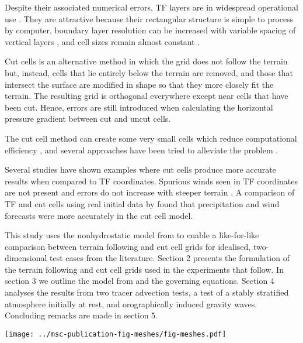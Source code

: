 \documentclass[twocol]{ametsoc}
\begin{document}
Despite their associated numerical errors, TF layers are in widespread operational use \citep{steppeler2003}.  They are attractive because their rectangular structure is simple to process by computer, boundary layer resolution can be increased with variable spacing of vertical layers \citep{schaer2002}, and cell sizes remain almost constant \citep{jebens2011}.

Cut cells is an alternative method in which the grid does not follow the terrain but, instead, cells that lie entirely below the terrain are removed, and those that intersect the surface are modified in shape so that they more closely fit the terrain.  The resulting grid is orthogonal everywhere except near cells that have been cut.  Hence, errors are still introduced when calculating the horizontal pressure gradient between cut and uncut cells.

The cut cell method can create some very small cells which reduce computational efficiency \citep{klein2009}, and several approaches have been tried to alleviate the problem \citep{steppeler2002,yamazaki-satomura2010,jebens2011}.

Several studies have shown examples where cut cells produce more accurate results when compared to TF coordinates.  Spurious winds seen in TF coordinates are not present and errors do not increase with steeper terrain \citep{good2014}.  A comparison of TF and cut cells using real initial data by \citet{steppeler2013} found that precipitation and wind forecasts were more accurately in the cut cell model.

This study uses the nonhydrostatic model from \citet{weller-shahrokhi2014} to enable a like-for-like comparison between terrain following and cut cell grids for idealised, two-dimensional test cases from the literature.  Section 2 presents the formulation of the terrain following and cut cell grids used in the experiments that follow.  In section 3 we outline the model from \citet{weller-shahrokhi2014} and the governing equations.  Section 4 analyses the results from two tracer advection tests, a test of a stably stratified atmosphere initially at rest, and orographically induced gravity waves.  Concluding remarks are made in section 5.

\begin{figure*}
	\centering
	\texttt{[image: ../msc-publication-fig-meshes/fig-meshes.pdf]}
	\caption{Examples of (a) BTF, (b) SLEVE, and (c) a cut cell grid, showing cell edges in the lowest four layers.  The two dimensional grids are \SI{20}{\kilo\meter} wide and \SI{20}{\kilo\meter} high.  SLEVE parameters are specified in the resting atmosphere test in section~\ref{sec:results}\ref{sec:resting}.  The cut cell grid was created by intersecting the terrain surface with a regular grid as described in section~\ref{sec:grid}.}
	\label{fig:grid}
\end{figure*}
\end{document}
